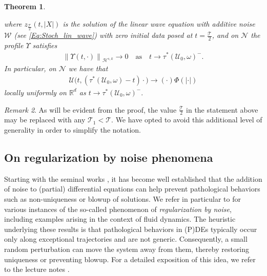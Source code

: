 \documentclass[12pt,reqno]{amsart}
\theoremstyle{plain}
\newtheorem{theorem}{Theorem}[section]
\theoremstyle{remark}
\newtheorem{remark}[theorem]{Remark}
\theoremstyle{plain}
\theoremstyle{definition}
\numberwithin{equation}{section}
\numberwithin{equation}{section}
\newcommand{\norm}[1]{\left\|#1\right\|}
\newcommand{\HH}{\mathcal{H}}
\begin{document}
\begin{theorem}
\begin{itemize}[leftmargin=2em]
			where $z_{\tfrac{\mathcal{T}}{2}}(t,|X|)$ is the solution of the linear wave equation with additive noise $\mathcal{W}$ (see \eqref{Eq:Stoch_lin_wave}) with zero initial data posed at $t=\tfrac{\mathcal{T}}{2}$, and on $\mathcal{N}$ the profile $\Upsilon$ satisfies
			\begin{align*}
				\norm{\Upsilon(t,\cdot)}_{\HH^{s,k}}\rightarrow 0\quad \text{as} \quad t \rightarrow \tau^*(\boldsymbol{\mathcal{U}}_0,\omega)^-. 
			\end{align*}
			In particular, on $\mathcal{N}$  we have that 
			\begin{align*}
				\mathcal{U}\big(t,(\tau^*(\boldsymbol{\mathcal{U}}_0,\omega)-t )\cdot\big)\rightarrow  (\cdot)\Phi(|\cdot|)  
			\end{align*}
			locally uniformly on $\mathbb{R}^d$ as $t\rightarrow \tau^*(\boldsymbol{\mathcal{U}}_0,\omega)^-.$
		\end{itemize}
	\end{theorem}
	\begin{remark}
		As will be evident from the proof, the value $\frac{\mathcal{T}}{2}$ in the statement above may be replaced with any  $\mathcal{T}_1 < \mathcal{T}$. We have opted to avoid this additional level of generality in order to simplify the notation.
	\end{remark}
	\subsection{On regularization by noise phenomena} Starting with the seminal works \cite{zvonkin1974transformation, veretennikov1981strong}, it has become well established that the addition of noise to (partial) differential equations can help prevent pathological behaviors such as non-uniqueness or blowup of solutions. We refer in particular to \cite{flandoli2010well,DP_regular_1, DP_regular_2, Priola, bertacco2023weak, beck2019stochastic, flandoli2021high, coghi2023existence, herr2023three,agresti2024global,crippa2025zero} for various instances of the so-called phenomenon of \emph{regularization by noise}, including examples arising in the context of fluid dynamics. The heuristic underlying these results is that pathological behaviors in (P)DEs typically occur only along exceptional trajectories and are not generic. Consequently, a small random perturbation can move the system away from them, thereby restoring uniqueness or preventing blowup. For a detailed exposition of this idea, we refer to the lecture notes \cite{flandoli2011random}. 
	
\end{document}
